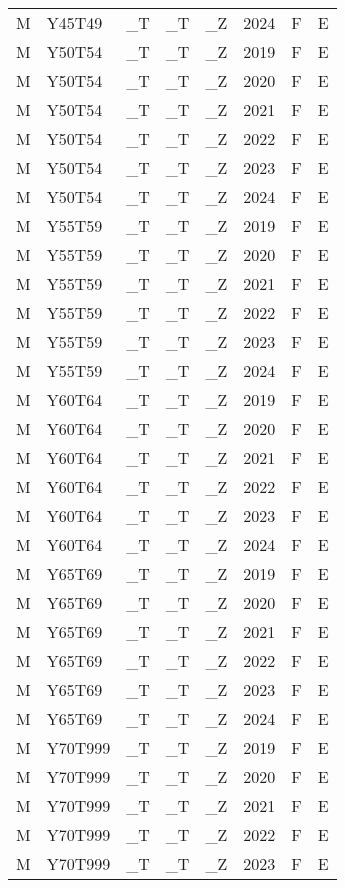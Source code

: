 \begin{longtable}[t]{llllllll}
M & Y45T49 & \_T & \_T & \_Z & 2024 & F & E\\
M & Y50T54 & \_T & \_T & \_Z & 2019 & F & E\\
M & Y50T54 & \_T & \_T & \_Z & 2020 & F & E\\
\addlinespace
M & Y50T54 & \_T & \_T & \_Z & 2021 & F & E\\
M & Y50T54 & \_T & \_T & \_Z & 2022 & F & E\\
M & Y50T54 & \_T & \_T & \_Z & 2023 & F & E\\
M & Y50T54 & \_T & \_T & \_Z & 2024 & F & E\\
M & Y55T59 & \_T & \_T & \_Z & 2019 & F & E\\
\addlinespace
M & Y55T59 & \_T & \_T & \_Z & 2020 & F & E\\
M & Y55T59 & \_T & \_T & \_Z & 2021 & F & E\\
M & Y55T59 & \_T & \_T & \_Z & 2022 & F & E\\
M & Y55T59 & \_T & \_T & \_Z & 2023 & F & E\\
M & Y55T59 & \_T & \_T & \_Z & 2024 & F & E\\
\addlinespace
M & Y60T64 & \_T & \_T & \_Z & 2019 & F & E\\
M & Y60T64 & \_T & \_T & \_Z & 2020 & F & E\\
M & Y60T64 & \_T & \_T & \_Z & 2021 & F & E\\
M & Y60T64 & \_T & \_T & \_Z & 2022 & F & E\\
M & Y60T64 & \_T & \_T & \_Z & 2023 & F & E\\
\addlinespace
M & Y60T64 & \_T & \_T & \_Z & 2024 & F & E\\
M & Y65T69 & \_T & \_T & \_Z & 2019 & F & E\\
M & Y65T69 & \_T & \_T & \_Z & 2020 & F & E\\
M & Y65T69 & \_T & \_T & \_Z & 2021 & F & E\\
M & Y65T69 & \_T & \_T & \_Z & 2022 & F & E\\
\addlinespace
M & Y65T69 & \_T & \_T & \_Z & 2023 & F & E\\
M & Y65T69 & \_T & \_T & \_Z & 2024 & F & E\\
M & Y70T999 & \_T & \_T & \_Z & 2019 & F & E\\
M & Y70T999 & \_T & \_T & \_Z & 2020 & F & E\\
M & Y70T999 & \_T & \_T & \_Z & 2021 & F & E\\
\addlinespace
M & Y70T999 & \_T & \_T & \_Z & 2022 & F & E\\
M & Y70T999 & \_T & \_T & \_Z & 2023 & F & E\\

\end{longtable}
